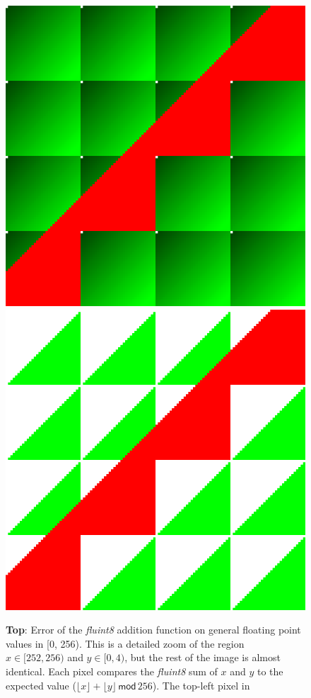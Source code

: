 \documentclass[twocolumn]{article}
\begin{document}
\begin{figure}[htp]
  \begin{center}
    \includegraphics[width=0.75 \linewidth]{add-error-detail}
     \\[1em]
    \includegraphics[width=0.75 \linewidth]{add-error-floor}
  \end{center}
  \caption { {\bf Top}: Error of the {\it fluint8} addition function on general
    floating point values in [0, 256). This is a detailed zoom of the
      region $x \in [252, 256)$ and $y \in [0, 4)$, but the rest of
          the image is almost identical. Each pixel compares the {\it fluint8} sum
          of $x$ and $y$ to the expected value ($\lfloor x \rfloor +
          \lfloor y \rfloor \,\textsf{mod}\, 256$). The top-left pixel in
}
\end{figure}
\end{document}
